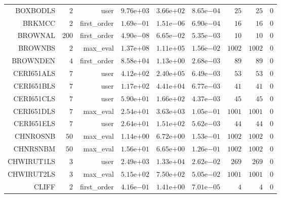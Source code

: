 \begin{longtable}{rrrrrrrrr}
BOXBODLS & \(     2\) & user & \( 9.76\)e\(+03\) & \( 3.66\)e\(+02\) & \( 8.65\)e\(-04\) & \(    25\) & \(    25\) & \(     0\) \\
BRKMCC & \(     2\) & first\_order & \( 1.69\)e\(-01\) & \( 1.51\)e\(-06\) & \( 6.90\)e\(-04\) & \(    16\) & \(    16\) & \(     0\) \\
BROWNAL & \(   200\) & first\_order & \( 4.90\)e\(-08\) & \( 6.65\)e\(-02\) & \( 5.35\)e\(-03\) & \(    10\) & \(    10\) & \(     0\) \\
BROWNBS & \(     2\) & max\_eval & \( 1.37\)e\(+08\) & \( 1.11\)e\(+05\) & \( 1.56\)e\(-02\) & \(  1002\) & \(  1002\) & \(     0\) \\
BROWNDEN & \(     4\) & first\_order & \( 8.58\)e\(+04\) & \( 1.13\)e\(+00\) & \( 2.68\)e\(-03\) & \(    89\) & \(    89\) & \(     0\) \\
CERI651ALS & \(     7\) & user & \( 4.12\)e\(+02\) & \( 2.40\)e\(+05\) & \( 6.49\)e\(-03\) & \(    53\) & \(    53\) & \(     0\) \\
CERI651BLS & \(     7\) & user & \( 1.17\)e\(+02\) & \( 4.41\)e\(+04\) & \( 6.77\)e\(-03\) & \(    41\) & \(    41\) & \(     0\) \\
CERI651CLS & \(     7\) & user & \( 5.90\)e\(+01\) & \( 1.66\)e\(+02\) & \( 4.37\)e\(-03\) & \(    45\) & \(    45\) & \(     0\) \\
CERI651DLS & \(     7\) & max\_eval & \( 2.54\)e\(+01\) & \( 3.63\)e\(+03\) & \( 1.05\)e\(-01\) & \(  1001\) & \(  1001\) & \(     0\) \\
CERI651ELS & \(     7\) & user & \( 2.64\)e\(+01\) & \( 1.51\)e\(+02\) & \( 5.62\)e\(-03\) & \(    44\) & \(    44\) & \(     0\) \\
CHNROSNB & \(    50\) & max\_eval & \( 1.14\)e\(+00\) & \( 6.72\)e\(+00\) & \( 1.53\)e\(-01\) & \(  1002\) & \(  1002\) & \(     0\) \\
CHNRSNBM & \(    50\) & max\_eval & \( 1.56\)e\(+01\) & \( 6.65\)e\(+00\) & \( 1.26\)e\(-01\) & \(  1002\) & \(  1002\) & \(     0\) \\
CHWIRUT1LS & \(     3\) & user & \( 2.49\)e\(+03\) & \( 1.33\)e\(+04\) & \( 2.62\)e\(-02\) & \(   269\) & \(   269\) & \(     0\) \\
CHWIRUT2LS & \(     3\) & max\_eval & \( 5.15\)e\(+02\) & \( 7.50\)e\(+02\) & \( 5.05\)e\(-02\) & \(  1001\) & \(  1001\) & \(     0\) \\
CLIFF & \(     2\) & first\_order & \( 4.16\)e\(-01\) & \( 1.41\)e\(+00\) & \( 7.01\)e\(-05\) & \(     4\) & \(     4\) & \(     0\) \\

\end{longtable}
